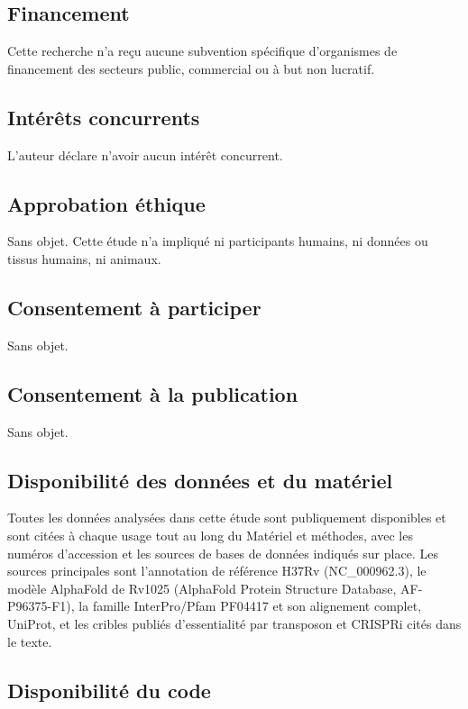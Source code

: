 \documentclass[11pt,a4paper]{article}
\begin{document}
\subsection*{Financement}

Cette recherche n'a reçu aucune subvention spécifique d'organismes de financement des secteurs public, commercial ou à but non lucratif.

\subsection*{Intérêts concurrents}

L'auteur déclare n'avoir aucun intérêt concurrent.

\subsection*{Approbation éthique}

Sans objet. Cette étude n'a impliqué ni participants humains, ni données ou tissus humains, ni animaux.

\subsection*{Consentement à participer}

Sans objet.

\subsection*{Consentement à la publication}

Sans objet.

\subsection*{Disponibilité des données et du matériel}

Toutes les données analysées dans cette étude sont publiquement disponibles et sont citées à chaque usage tout au long du Matériel et méthodes, avec les numéros d'accession et les sources de bases de données indiqués sur place. Les sources principales sont l'annotation de référence H37Rv (NC\_000962.3), le modèle AlphaFold de Rv1025 (AlphaFold Protein Structure Database, AF-P96375-F1), la famille InterPro/Pfam PF04417 et son alignement complet, UniProt, et les cribles publiés d'essentialité par transposon et CRISPRi cités dans le texte.

\subsection*{Disponibilité du code}
\end{document}
